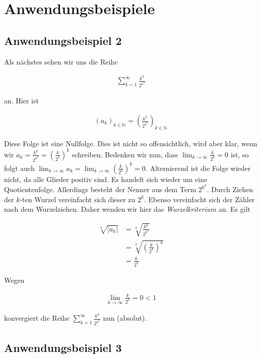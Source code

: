 \documentclass[fontsize=9pt,
               parskip=half-,
               DIV=14,
               listof=chapterentry,
               tocflat]{scrbook}
\begin{document}
\section{Anwendungsbeispiele}

\subsection{Anwendungsbeispiel 2}

Als nächstes sehen wir uns die Reihe

\begin{align*}
\sum _{k=1}^{\infty }{\frac {k^{k}}{2^{k^{2}}}}
\end{align*}

an. Hier ist

\begin{align*}
(a_{k})_{k\in \mathbb {N} }=\left({\frac {k^{k}}{2^{k^{2}}}}\right)_{k\in \mathbb {N} }
\end{align*}

Diese Folge ist eine Nullfolge. Dies ist nicht so offensichtlich, wird aber klar, wenn wir $a_{k}={\tfrac {k^{k}}{2^{k^{2}}}}=\left({\tfrac {k}{2^{k}}}\right)^{k}$ schreiben. Bedenken wir nun, dass $\lim _{k\to \infty }{\tfrac {k}{2^{k}}}=0$ ist, so folgt auch $\lim _{k\to \infty }a_{k}=\lim _{k\to \infty }\left({\tfrac {k}{2^{k}}}\right)^{k}=0$. Alternierend ist die Folge wieder nicht, da alle Glieder positiv sind. Es handelt sich wieder um eine Quotientenfolge. Allerdings besteht der Nenner aus dem Term $2^{k^{2}}$. Durch Ziehen der $k$-ten Wurzel vereinfacht sich dieser zu $2^{k}$. Ebenso vereinfacht sich der Zähler nach dem Wurzelziehen. Daher wenden wir hier das \emph{Wurzelkriterium} an. Es gilt

\begin{align*}
{\sqrt[{k}]{|a_{k}|}}&={\sqrt[{k}]{\frac {k^{k}}{2^{k^{2}}}}}\\[0.5em]&={\sqrt[{k}]{\left({\frac {k}{2^{k}}}\right)^{k}}}\\[0.5em]&={\frac {k}{2^{k}}}
\end{align*}

Wegen

\begin{align*}
\lim _{k\to \infty }{\frac {k}{2^{k}}}=0<1
\end{align*}

konvergiert die Reihe $\sum _{k=1}^{\infty }{\tfrac {k^{k}}{2^{k^{2}}}}$ nun (absolut).

\subsection{Anwendungsbeispiel 3}
\end{document}
